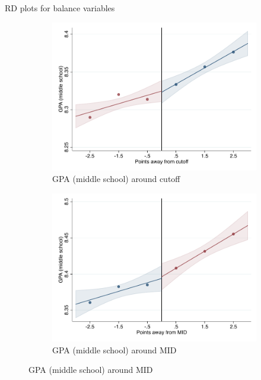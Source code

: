 \documentclass[notes,11pt, aspectratio=169]{beamer}
\begin{document}
\begin{frame}{RD plots for balance variables}
\hyperlink{balance_rd_plot}{}
\begin{figure}

    \begin{subfigure}{0.45\textwidth}
        \centering
        \caption{GPA (middle school) around cutoff}
        \includegraphics[width=\textwidth]{04_Figures/rd_plot_tau_sus_prom_IPN3.pdf}
    \end{subfigure}
    \begin{subfigure}{0.45\textwidth}
        \centering
        \caption{GPA (middle school) around MID}
        \includegraphics[width=\textwidth]{04_Figures/rd_plot_mid_sus_prom_IPN3.pdf}
    \end{subfigure}
    
\end{figure}
\end{frame}
\end{document}
